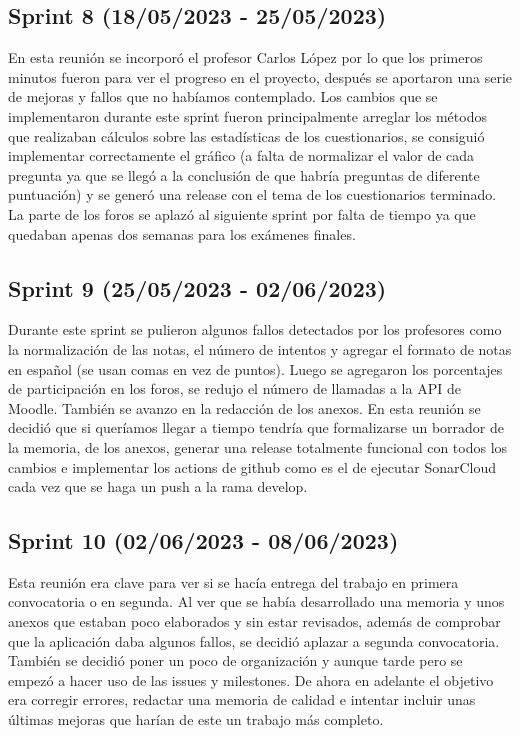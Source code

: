 \subsection{Sprint 8 (18/05/2023 - 25/05/2023)}
	En esta reunión se incorporó el profesor Carlos López por lo que los primeros minutos fueron para ver el progreso en el proyecto, después se aportaron una serie de mejoras y fallos que no habíamos contemplado. Los cambios que se implementaron durante este sprint fueron principalmente arreglar los métodos que realizaban cálculos sobre las estadísticas de los cuestionarios, se consiguió implementar correctamente el gráfico (a falta de normalizar el valor de cada pregunta ya que se llegó a la conclusión de que habría preguntas de diferente puntuación) y se generó una release con el tema de los cuestionarios terminado. La parte de los foros se aplazó al siguiente sprint por falta de tiempo ya que quedaban apenas dos semanas para los exámenes finales.

\subsection{Sprint 9 (25/05/2023 - 02/06/2023)}
	Durante este sprint se pulieron algunos fallos detectados por los profesores como la normalización de las notas, el número de intentos y agregar el formato de notas en español (se usan comas en vez de puntos). Luego se agregaron los porcentajes de participación en los foros, se redujo el número de llamadas a la API de Moodle. También se avanzo en la redacción de los anexos. En esta reunión se decidió que si queríamos llegar a tiempo tendría que formalizarse un borrador de la memoria, de los anexos, generar una release totalmente funcional con todos los cambios e implementar los actions de github como es el de ejecutar SonarCloud cada vez que se haga un push a la rama develop.

 \subsection{Sprint 10 (02/06/2023 - 08/06/2023)}
	Esta reunión era clave para ver si se hacía entrega del trabajo en primera convocatoria o en segunda. Al ver que se había desarrollado una memoria y unos anexos que estaban poco elaborados y sin estar revisados, además de comprobar que la aplicación daba algunos fallos, se decidió aplazar a segunda convocatoria. También se decidió poner un poco de organización y aunque tarde pero se empezó a hacer uso de las issues y milestones. De ahora en adelante el objetivo era corregir errores, redactar una memoria de calidad e intentar incluir unas últimas mejoras que harían de este un trabajo más completo.

